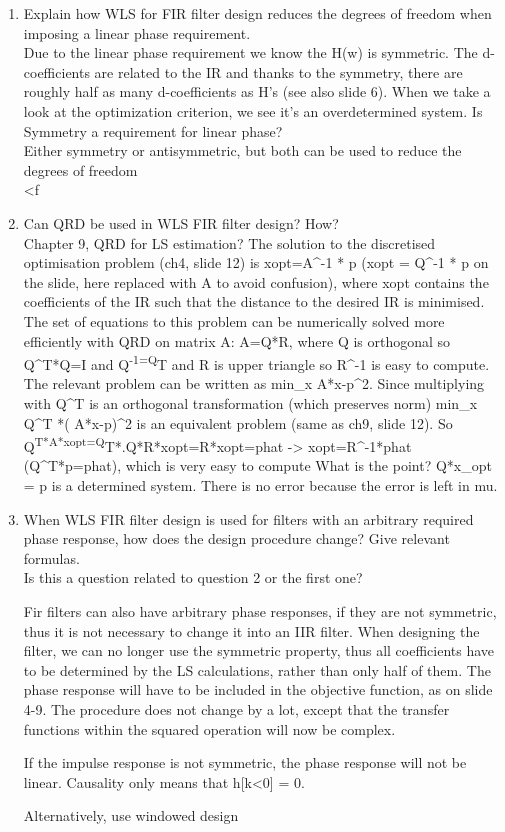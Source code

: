 \documentclass[
  a4paper,
  ,captions=tableheading
]{scrartcl}
\begin{document}
\begin{enumerate}
\def\labelenumi{\arabic{enumi}.}
\item
  Explain how WLS for FIR filter design reduces the degrees of freedom
  when imposing a linear phase requirement.\\
  Due to the linear phase requirement we know the H(w) is symmetric. The
  d-coefficients are related to the IR and thanks to the symmetry, there
  are roughly half as many d-coefficients as H's (see also slide 6).
  When we take a look at the optimization criterion, we see it's an
  overdetermined system. Is Symmetry a requirement for linear phase?\\
  Either symmetry or antisymmetric, but both can be used to reduce the
  degrees of freedom\\
  \textless f\\
\item
  Can QRD be used in WLS FIR filter design? How?\\
  Chapter 9, QRD for LS estimation? The solution to the discretised
  optimisation problem (ch4, slide 12) is xopt=A\^{}-1 * p (xopt =
  Q\^{}-1 * p on the slide, here replaced with A to avoid confusion),
  where xopt contains the coefficients of the IR such that the distance
  to the desired IR is minimised. The set of equations to this problem
  can be numerically solved more efficiently with QRD on matrix A:
  A=Q*R, where Q is orthogonal so Q\^{}T*Q=I and
  Q\textsuperscript{-1=Q}T and R is upper triangle so R\^{}-1 is easy to
  compute. The relevant problem can be written as min\_x
  \textbar\textbar A*x-p\textbar\textbar\^{}2. Since multiplying with
  Q\^{}T is an orthogonal transformation (which preserves norm) min\_x
  \textbar\textbar Q\^{}T *( A*x-p)\textbar\textbar\^{}2 is an
  equivalent problem (same as ch9, slide 12). So
  Q\textsuperscript{T*A*xopt=Q}T*.Q*R*xopt=R*xopt=phat -\textgreater{}
  xopt=R\^{}-1*phat (Q\^{}T*p=phat), which is very easy to compute What
  is the point? Q*x\_opt = p is a determined system. There is no error
  because the error is left in mu.\\
\item
  When WLS FIR filter design is used for filters with an arbitrary
  required phase response, how does the design procedure change? Give
  relevant formulas.\\
  Is this a question related to question 2 or the first one?

  Fir filters can also have arbitrary phase responses, if they are not
  symmetric, thus it is not necessary to change it into an IIR filter.
  When designing the filter, we can no longer use the symmetric
  property, thus all coefficients have to be determined by the LS
  calculations, rather than only half of them. The phase response will
  have to be included in the objective function, as on slide 4-9. The
  procedure does not change by a lot, except that the transfer functions
  within the squared operation will now be complex.

  If the impulse response is not symmetric, the phase response will not
  be linear. Causality only means that h{[}k\textless0{]} = 0.

  Alternatively, use windowed design
\end{enumerate}
\end{document}
